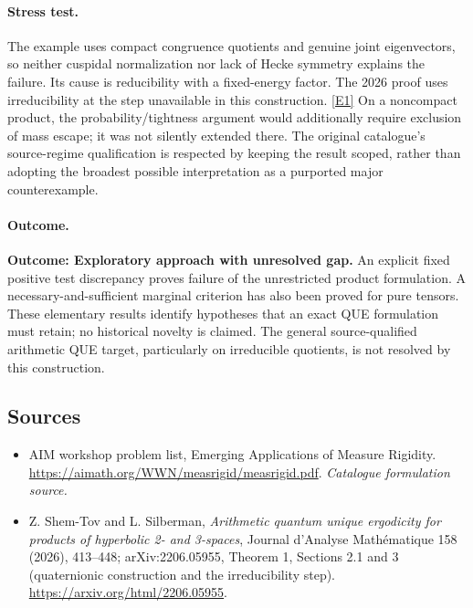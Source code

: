 \documentclass[11pt,a4paper]{article}
\newcommand{\eref}[2]{\hyperlink{extra:#1:#2}{[E#2]}}
\numberwithin{equation}{section}
\begin{document}
\paragraph{Stress test.}
The example uses compact congruence quotients and genuine joint eigenvectors,
so neither cuspidal normalization nor lack of Hecke symmetry explains the
failure. Its cause is reducibility with a fixed-energy factor. The 2026
proof uses irreducibility at the step unavailable in this construction.
\eref{statement}{1} On a noncompact product, the probability/tightness argument
would additionally require exclusion of mass escape; it was not silently
extended there. The original catalogue's source-regime qualification is
respected by keeping the result scoped, rather than adopting the broadest
possible interpretation as a purported major counterexample.

\paragraph{Outcome.}
\textbf{Outcome: Exploratory approach with unresolved gap.}
An explicit fixed positive test discrepancy proves failure of the unrestricted
product formulation. A necessary-and-sufficient marginal criterion has also
been proved for pure tensors. These elementary results identify hypotheses
that an exact QUE formulation must retain; no historical novelty is claimed.
The general source-qualified arithmetic QUE target, particularly on
irreducible quotients, is not resolved by this construction.

\subsection{Sources}
\begin{itemize}\raggedright
\item[\textnormal{[S1]}]\hypertarget{source:statement:1}{} AIM workshop problem list, Emerging Applications of Measure Rigidity.
\url{https://aimath.org/WWN/measrigid/measrigid.pdf}.
{\small\textit{Catalogue formulation source.}}
\item[\textnormal{[E1]}]\hypertarget{extra:statement:1}{} Z. Shem-Tov and L. Silberman,
\emph{Arithmetic quantum unique ergodicity for products of hyperbolic 2- and
3-spaces}, Journal d'Analyse Math\'ematique 158 (2026), 413--448;
arXiv:2206.05955, Theorem 1, Sections 2.1 and 3 (quaternionic construction
and the irreducibility step). \url{https://arxiv.org/html/2206.05955}.

\end{itemize}
\end{document}

